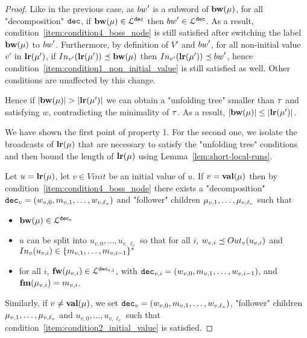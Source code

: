 \begin{proof}
	Like in the previous case, as $\bossspec'$ is a subword of $\mathbf{bw}(\mu)$, for all "decomposition" $\mathtt{dec}$, if $\mathbf{bw}(\mu) \in \mathcal{L}^{\mathtt{\mathtt{dec}}}$ then $\bossspec' \in \langdec{\decsymb}$. As a result, condition~\ref{item:condition4_boss_node} is still satisfied after switching the label $\mathbf{bw}(\mu)$ to $\bossspec'$. Furthermore, by definition of $V'$ and $\bossspec'$, for all non-initial value $v'$ in $\mathbf{lr}(\mu')$, if $\vinput{v'}{\localrunlabel{\node'}} \subword \bosslabel{\node}$ then  $\vinput{v'}{\localrunlabel{\node'}} \subword \bossspec'$, hence condition~\ref{item:condition1_non_initial_value} is still satisfied as well. Other conditions are unaffected by this change.
	
	Hence if $|\mathbf{bw}(\mu)| > |\mathbf{lr}(\mu')|$ we can obtain a "unfolding tree" smaller than $\tau$ and satisfying $w$, contradicting the minimality of $\tau$. As a result, $|\mathbf{bw}(\mu)| \leq |\mathbf{lr}(\mu')|$.
	
	We have shown the first point of property 1. For the second one, we isolate the broadcasts of $\mathbf{lr}(\mu)$ that are necessary to satisfy the "unfolding tree" conditions and then bound the length of $\mathbf{lr}(\mu)$ using Lemma~\ref{lem:short-local-runs}.
	
	Let $u = \mathbf{lr}(\mu)$, let $v \in Vinit$ be an initial value of $u$. If $v = \mathbf{val}(\mu)$ then by condition~\ref{item:condition4_boss_node} there exists a "decomposition" $\mathtt{dec}_v = (w_{v,0}, m_{v,1}, \ldots, w_{v,\ell_v})$ and "follower" children $\mu_{v,1}, \ldots, \mu_{v,\ell_v}$ such that
	\begin{itemize}
		\item $\mathbf{bw}(\mu) \in \mathcal{L}^{\mathtt{\mathtt{dec}_v}}$
		\item $u$ can be split into $u_{v,0}, \ldots, u_{v,\ell_v}$ so that for all $i$, $w_{v,i} \subword \voutput{v}{u_{v,i}}$ and $\vinput{v}{u_{v,i}} \in \set{m_{v,1}, \ldots, m_{v,i-1}}^*$
		
		\item for all $i$, $\mathbf{fw}(\mu_{v,i}) \in \mathcal{L}^{\mathtt{\mathtt{dec}_{v,i}}}$, with $\mathtt{dec}_{v,i}= (w_{v,0}, m_{v,1}, \ldots, w_{v,i-1})$, and $\mathbf{fm}(\mu_{v,i}) = m_{v,i}$.
	\end{itemize}
	
	Similarly, if $v \neq \mathbf{val}(\mu)$, we set $\mathtt{dec}_v = (w_{v,0}, m_{v,1}, \ldots, w_{v,\ell_v})$, "follower" children $\mu_{v,1}, \ldots, \mu_{v, \ell_v}$ and $u_{v,0}, \ldots, u_{v,\ell_v}$ such that condition~\ref{item:condition2_initial_value} is satisfied.
	

\end{proof}
